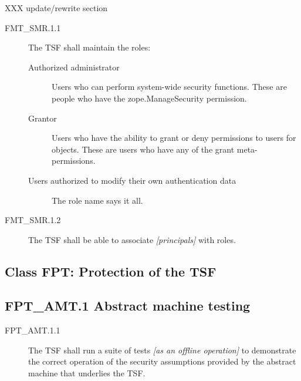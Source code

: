 \documentclass[12pt,english]{scrbook}
\begin{document}
XXX update/rewrite section
\begin{description}
\item[FMT{\_}SMR.1.1]

The TSF shall maintain the roles:
\begin{description}
\item[Authorized administrator]

Users who can perform system-wide security functions. These are
people who have the zope.ManageSecurity permission.

\item[Grantor ]

Users who have the ability to grant or deny permissions to
users for objects.  These are users who have any of the grant
meta-permissions.

\item[Users authorized to modify their own authentication data]

The role name says it all.

\end{description}

\item[FMT{\_}SMR.1.2]

The TSF shall be able to associate \emph{{[}principals]} with roles.

\end{description}





\subsection{Class FPT: Protection of the TSF}





\subsection{FPT{\_}AMT.1 Abstract machine testing}
\begin{description}
\item[FPT{\_}AMT.1.1 ]

The TSF shall run a suite of tests \emph{{[}as an offline
operation]} to demonstrate the correct operation of the security
assumptions provided by the abstract machine that underlies the
TSF.

\end{description}
\end{document}
